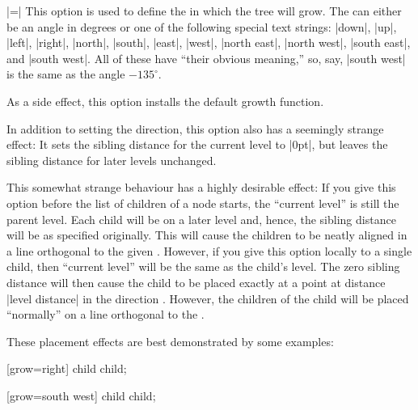 \begin{itemize}
  |=|
  This option is used to define the  in which the tree
  will grow. The  can either be an angle in degrees or
  one of the following special text strings: |down|, |up|, |left|,
  |right|, |north|, |south|, |east|, |west|, |north east|,
  |north west|, |south east|, and |south west|. All of these have
  ``their obvious meaning,'' so, say, |south west| is the same as the
  angle $-135^\circ$.

  As a side effect, this option installs the default growth function.

  In addition to setting the direction, this option also has a
  seemingly strange effect: It sets the sibling distance for the
  current level to |0pt|, but leaves the sibling distance for later
  levels unchanged.

  This somewhat strange behaviour has a highly desirable effect: If
  you give this option before the list of children of a node starts,
  the ``current level'' is still the parent level. Each child will be
  on a later level and, hence, the sibling distance will be as
  specified originally. This will cause the children to be neatly
  aligned in a line orthogonal to the given . However,
  if you give this option locally to a single child, then ``current
  level'' will be the same as the child's level. The zero sibling
  distance will then cause the child to be placed exactly at a point
  at distance |level distance| in the direction
  . However, the children of the child will be placed
  ``normally'' on a line orthogonal to the .

  These placement effects are best demonstrated by some examples:
\begin{codeexample}[]
\tikz {} [grow=right] child child;
\end{codeexample}

\begin{codeexample}[]
\tikz {} [grow=south west] child child;
\end{codeexample}

\begin{codeexample}[]
\end{codeexample}


\end{itemize}

